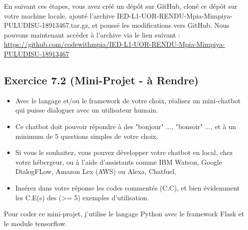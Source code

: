 \documentclass[a4paper,11pt]{article}
\begin{document}
\begin{enumerate}
\begin{itemize}
\begin{itemize}
                            \begin{tcolorbox}[colback=lightgray!6, colframe=black, left=2mm, right=5mm, top=2mm, bottom=0mm, boxrule=0.1mm]
                                En suivant ces étapes, vous avez créé un dépôt sur GitHub, cloné ce dépôt sur votre machine locale, 
                                ajouté l'archive IED-L1-UOR-RENDU-Mpia-Mimpiya-PULUDISU-18913467.tar.gz, et poussé les modifications vers GitHub. 
                                Nous pouvons maintenant accéder à l'archive via le lien suivant : \url{https://github.com/codewithmpia/IED-L1-UOR-RENDU-Mpia-Mimpiya-PULUDISU-18913467}
                            \end{tcolorbox}
                        \end{itemize}
                    \end{itemize}
            \end{enumerate}


        \newpage
        \subsection{Exercice 7.2 (Mini-Projet - à Rendre)}
            \begin{itemize}
                \item  Avec le langage et/ou le framework de votre choix, réalisez
                un mini-chatbot qui puisse dialoguer avec un utilisateur humain.

                \item Ce chatbot doit pouvoir répondre à des "bonjour" ..., "bonsoir" ..., et à un minimum de 5 questions simples de votre choix.
                
                \item Si vous le souhaitez, vous pouvez développer votre chatbot en local, chez votre hébergeur, ou à l’aide d’assistants comme IBM Watson, Google DialogFLow, Amazon Lex (AWS) ou Alexa, Chatfuel,
                
                \item Insérez dans votre réponse les codes commentés (C.C), et bien évidemment les C.E(s) des (>= 5) exemples d’utilisation.
            \end{itemize}  
            
            
            \bigskip
            \noindent Pour coder ce mini-projet, j'utilise le langage Python avec le framework Flask et le module tensorflow.
\end{document}

